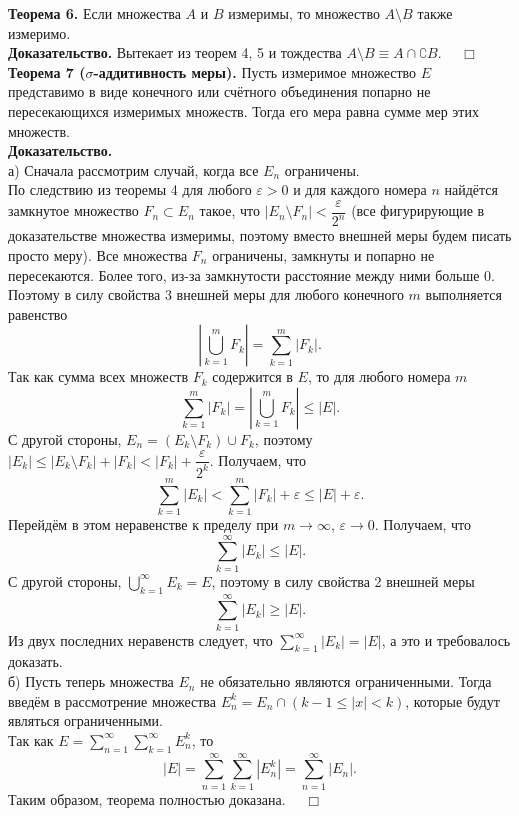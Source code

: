\documentclass[12pt,a4paper, titlepage]{article}
\begin{document}
\textbf{Теорема 6.} Если множества $A$ и $B$ измеримы, то множество $A \setminus B$ также измеримо.\\
\textbf{Доказательство.} Вытекает из теорем 4, 5 и тождества $A \setminus B \equiv A \cap \complement B$. $\quad \Box$\\

\textbf{Теорема 7 ($\sigma$-аддитивность меры).} Пусть измеримое множество $E$ представимо в виде конечного или счётного объединения попарно не пересекающихся измеримых множеств. Тогда его мера равна сумме мер этих множеств.\\ 
\textbf{Доказательство.}\\
а) Сначала рассмотрим случай, когда все $E_n$ ограничены.\\
По следствию из теоремы 4 для любого $\varepsilon > 0$ и для каждого номера $n$ найдётся замкнутое множество $F_n \subset E_n$ такое, что $|E_n \setminus F_n| < \dfrac{\varepsilon}{2^n}$ (все фигурирующие в доказательстве множества измеримы, поэтому вместо внешней меры будем писать просто меру). Все множества $F_n$ ограничены, замкнуты и попарно не пересекаются. Более того, из-за замкнутости расстояние между ними больше 0. Поэтому в силу свойства 3 внешней меры для любого конечного $m$ выполняется равенство
$$
\left| \bigcup_{k=1}^m F_k \right| = \sum_{k=1}^m |F_k|.
$$
Так как сумма всех множеств $F_k$ содержится в $E$, то для любого номера $m$
$$
\sum_{k=1}^m |F_k| = \left| \bigcup_{k=1}^m F_k \right| \leqslant |E|.
$$
С другой стороны, $E_n = (E_k \setminus F_k) \cup F_k$, поэтому $|E_k| \leqslant |E_k \setminus F_k| + |F_k| < |F_k| + \dfrac \varepsilon {2^k}$. Получаем, что
$$
\sum_{k=1}^m |E_k| < \sum_{k=1}^m |F_k| + \varepsilon \leqslant |E| + \varepsilon.
$$
Перейдём в этом неравенстве к пределу при $m \to \infty$, $\varepsilon \to 0$. Получаем, что
$$
\sum_{k=1}^\infty |E_k| \leqslant |E|.
$$
С другой стороны, $\bigcup\limits_{k=1}^\infty E_k = E$, поэтому в силу свойства 2 внешней меры
$$
\sum_{k=1}^\infty |E_k| \geqslant |E|.
$$
Из двух последних неравенств следует, что $\sum\limits_{k=1}^\infty |E_k| = |E|$, а это и требовалось доказать.\\

б) Пусть теперь множества $E_n$ не обязательно являются ограниченными. Тогда введём в рассмотрение множества $E_n^k = E_n \cap (k - 1 \leqslant |x| < k)$, которые будут являться ограниченными.\\

Так как $E = \sum\limits_{n=1}^\infty \sum\limits_{k=1}^\infty E_n^k$, то
$$
|E| = \sum\limits_{n=1}^\infty \sum\limits_{k=1}^\infty |E_n^k| = \sum\limits_{n=1}^\infty |E_n|.
$$
Таким образом, теорема полностью доказана. $\quad \Box$\\
\end{document}
